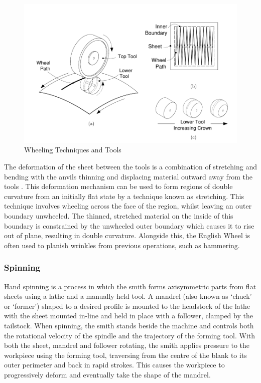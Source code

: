 \begin{figure}[h]
    \centering
    \includegraphics[width=0.8\linewidth]{Images/WheelingTechDrawing.pdf}
    \caption{Wheeling Techniques and Tools}
    \label{fig:WheelingTech}
\end{figure}


The deformation of the sheet between the tools is a combination of stretching and bending with the anvils thinning and displacing material outward away from the tools \citep{Bowen2021NumericalProcess}.  This deformation mechanism can be used to form regions of double curvature from an initially flat state by a technique known as stretching. This technique involves wheeling across the face of the region, whilst leaving an outer boundary unwheeled. The thinned, stretched material on the inside of this boundary is constrained by the unwheeled outer boundary which causes it to rise out of plane, resulting in double curvature. Alongside this, the English Wheel is often used to planish wrinkles from previous operations, such as hammering.

\subsubsection{Spinning} \label{sec:ManualSpinning}
Hand spinning is a process in which the smith forms axisymmetric parts from flat sheets using a lathe and a manually held tool. A mandrel (also known as `chuck’ or `former’) shaped to a desired profile is mounted to the headstock of the lathe with the sheet mounted in-line and held in place with a follower, clamped by the tailstock. When spinning, the smith stands beside the machine and controls both the rotational velocity of the spindle and the trajectory of the forming tool. With both the sheet, mandrel and follower rotating, the smith applies pressure to the workpiece using the forming tool, traversing from the centre of the blank to its outer perimeter and back in rapid strokes. This causes the workpiece to progressively deform and eventually take the shape of the mandrel.

